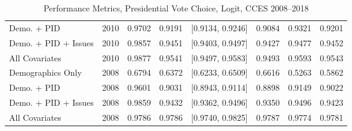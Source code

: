 \begin{table}[ht]
\begin{tabular}{lrrrlrrr}
  Demo. + PID & 2010 & 0.9702 & 0.9191 & [0.9134, 0.9246] & 0.9084 & 0.9321 & 0.9201 \\ 
  Demo. + PID + Issues & 2010 & 0.9857 & 0.9451 & [0.9403, 0.9497] & 0.9427 & 0.9477 & 0.9452 \\ 
  All Covariates & 2010 & 0.9877 & 0.9541 & [0.9497, 0.9583] & 0.9493 & 0.9593 & 0.9543 \\ 
  Demographics Only & 2008 & 0.6794 & 0.6372 & [0.6233, 0.6509] & 0.6616 & 0.5263 & 0.5862 \\ 
  Demo. + PID & 2008 & 0.9601 & 0.9031 & [0.8943, 0.9114] & 0.8898 & 0.9149 & 0.9022 \\ 
  Demo. + PID + Issues & 2008 & 0.9859 & 0.9432 & [0.9362, 0.9496] & 0.9350 & 0.9496 & 0.9423 \\ 
  All Covariates & 2008 & 0.9786 & 0.9786 & [0.9740, 0.9825] & 0.9787 & 0.9774 & 0.9781 \\ 
   \bottomrule
\end{tabular}
\caption{Performance Metrics, Presidential Vote Choice, Logit, CCES 2008--2018} 
\label{tab:cces_preschoice_logit}
\end{table}
